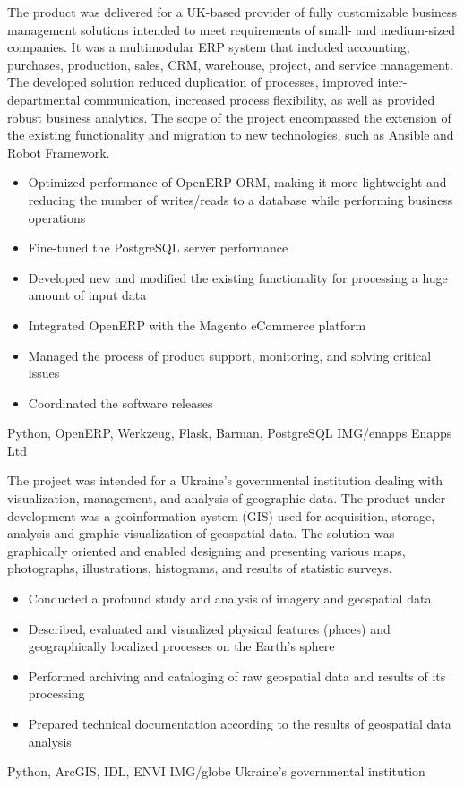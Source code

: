 \documentclass[paper=a4,fontsize=11pt]{temp} %
\begin{document}
{The product was delivered for a UK-based provider of fully customizable business management solutions intended to meet
requirements of small- and medium-sized companies. It was a multimodular ERP system that included accounting,
purchases, production, sales, CRM, warehouse, project, and service management. The developed solution reduced
duplication of processes, improved inter-departmental communication, increased process flexibility, as well as provided
robust business analytics.
The scope of the project encompassed the extension of the existing functionality and migration to new technologies, such as
Ansible and Robot Framework.}
{
\begin{itemize}
    \setlength\itemsep{0em}
    \item Optimized performance of OpenERP ORM, making it more lightweight and reducing the number of writes/reads to a database while
performing business operations
    \item Fine-tuned the PostgreSQL server performance
    \item Developed new and modified the existing functionality for processing a huge amount of input data
    \item Integrated OpenERP with the Magento eCommerce platform
    \item Managed the process of product support, monitoring, and solving critical issues
    \item Coordinated the software releases
\end{itemize}
}
{Python, OpenERP, Werkzeug, Flask, Barman, PostgreSQL}
{IMG/enapps}
{Enapps Ltd}

\sepspace

{The project was intended for a Ukraine’s governmental institution dealing with visualization, management, and analysis
of geographic data. The product under development was a geoinformation system (GIS) used for acquisition, storage,
analysis and graphic visualization of geospatial data. The solution was graphically oriented and enabled designing and
presenting various maps, photographs, illustrations, histograms, and results of statistic surveys.}
{
\begin{itemize}
    \setlength\itemsep{0em}
    \item Conducted a profound study and analysis of imagery and geospatial data
    \item Described, evaluated and visualized physical features (places) and geographically localized processes on the
        Earth's sphere
    \item Performed archiving and cataloging of raw geospatial data and results of its processing
    \item Prepared technical documentation according to the results of geospatial data analysis
\end{itemize}
}
{Python, ArcGIS, IDL, ENVI}
{IMG/globe}
{Ukraine’s governmental institution}
\end{document}
